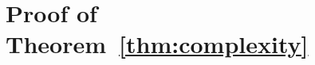 \documentclass[10pt,journal]{IEEEtran}
\newcommand{\G}{\boldsymbol{G}}
\newcommand{\Q}{\boldsymbol{Q}}
\begin{document}
\section{Proof of Theorem~\ref{thm:complexity}}\label{app:complexity}
%
\end{document}
